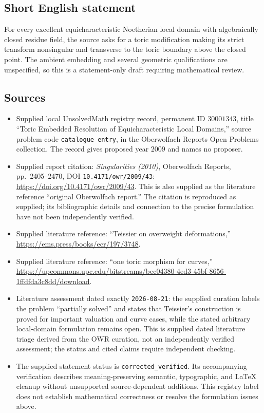 \documentclass[11pt]{article}
\begin{document}
\subsection{Short English statement}
For every excellent equicharacteristic Noetherian local domain with algebraically closed residue field, the source asks for a toric modification making its strict transform nonsingular and transverse to the toric boundary above the closed point. The ambient embedding and several geometric qualifications are unspecified, so this is a statement-only draft requiring mathematical review.
\subsection{Sources}
\begin{itemize}
\item Supplied local UnsolvedMath registry record, permanent ID \(30001343\), title ``Toric Embedded Resolution of Equicharacteristic Local Domains,'' source problem code \texttt{catalogue entry}, in the Oberwolfach Reports Open Problems collection. The record gives proposed year \(2009\) and names no proposer.
\item Supplied report citation: \emph{Singularities (2010)}, Oberwolfach Reports, pp.~2405--2470, DOI \texttt{10.4171/owr/2009/43}: \url{https://doi.org/10.4171/owr/2009/43}. This is also supplied as the literature reference ``original Oberwolfach report.'' The citation is reproduced as supplied; its bibliographic details and connection to the precise formulation have not been independently verified.
\item Supplied literature reference: ``Teissier on overweight deformations,'' \url{https://ems.press/books/ecr/197/3748}.
\item Supplied literature reference: ``one toric morphism for curves,'' \url{https://upcommons.upc.edu/bitstreams/bec04380-4ed3-45bf-8656-1ffdfda3c8dd/download}.
\item Literature assessment dated exactly \texttt{2026-08-21}: the supplied curation labels the problem ``partially solved'' and states that Teissier's construction is proved for important valuation and curve cases, while the stated arbitrary local-domain formulation remains open. This is supplied dated literature triage derived from the OWR curation, not an independently verified assessment; the status and cited claims require independent checking.
\item The supplied statement status is \texttt{corrected\_verified}. Its accompanying verification describes meaning-preserving semantic, typographic, and LaTeX cleanup without unsupported source-dependent additions. This registry label does not establish mathematical correctness or resolve the formulation issues above.
\end{itemize}
\end{document}
